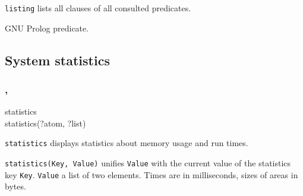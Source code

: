 \texttt{listing} lists all clauses of all consulted predicates.

\begin{PlErrors}


\end{PlErrors}

\Portability

GNU Prolog predicate.

\subsection{System statistics}

\subsubsection{,\label{statistics/2}
               }

\begin{TemplatesOneCol}
statistics\\
statistics(?atom, ?list)

\end{TemplatesOneCol}

\Description

\texttt{statistics} displays statistics about memory usage and run times.

\texttt{statistics(Key, Value)} unifies \texttt{Value} with the current
value of the statistics key \texttt{Key}. \texttt{Value} a list of two
elements. Times are in milliseconds, sizes of areas in bytes.

